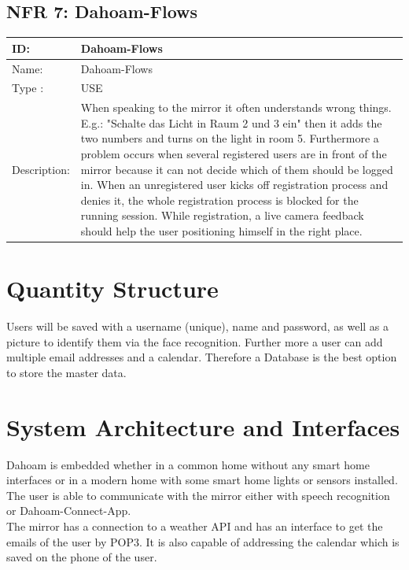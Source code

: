 \documentclass[12pt]{article}
\theoremstyle{definition}
\begin{document}
\subsection{NFR 7: Dahoam-Flows}
\begin{tabular}{|p{.2\linewidth}|p{.65\linewidth}|}
\hline 
ID: & Dahoam-Flows \\ \hline
Name: & Dahoam-Flows \\ \hline
Type	: & USE\\ \hline
Description: & When speaking to the mirror it often understands wrong things. E.g.: "Schalte das Licht in Raum 2 und 3 ein" then it adds the two numbers and turns on the light in room 5. Furthermore a problem occurs when several registered users are in front of the mirror because it can not decide which of them should be logged in. When an unregistered user kicks off registration process and denies it, the whole registration process is blocked for the running session. While registration, a live camera feedback should help the user positioning himself in the right place.
\\ \hline
\end{tabular}


\pagebreak

\section{Quantity Structure}

Users will be saved with a username (unique), name and password, as well as a picture to identify them via the face recognition. Further more a user can add multiple email addresses and a calendar. Therefore a Database is the best option to store the master data.

\pagebreak
\section{System Architecture and Interfaces}
Dahoam is embedded whether in a common home without any smart home interfaces or in a modern home with some smart home lights or sensors installed.\\
The user is able to communicate with the mirror either with speech recognition or Dahoam-Connect-App. \\
The mirror has a connection to a weather API and has an interface to get the emails of the user by POP3. It is also capable of addressing the calendar which is saved on the phone of the user. \\
\end{document}
